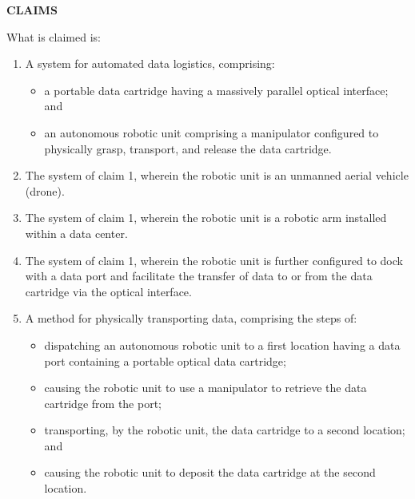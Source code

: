 \documentclass[11pt,letterpaper]{article}
\begin{document}
\thispagestyle{empty}

\begin{center}
    \textbf{\large CLAIMS}
\end{center}

\vspace{0.4cm}
\noindent What is claimed is:

\begin{enumerate}[label=\textbf{\arabic*.}, leftmargin=0.5in, itemsep=0.4cm]
    \item A system for automated data logistics, comprising:
    \begin{itemize}[leftmargin=0.3in, noitemsep]
        \item a portable data cartridge having a massively parallel optical interface; and
        \item an autonomous robotic unit comprising a manipulator configured to physically grasp, transport, and release the data cartridge.
    \end{itemize}

    \item The system of claim 1, wherein the robotic unit is an unmanned aerial vehicle (drone).

    \item The system of claim 1, wherein the robotic unit is a robotic arm installed within a data center.

    \item The system of claim 1, wherein the robotic unit is further configured to dock with a data port and facilitate the transfer of data to or from the data cartridge via the optical interface.

    \item A method for physically transporting data, comprising the steps of:
    \begin{itemize}[leftmargin=0.3in, noitemsep]
        \item dispatching an autonomous robotic unit to a first location having a data port containing a portable optical data cartridge;
        \item causing the robotic unit to use a manipulator to retrieve the data cartridge from the port;
        \item transporting, by the robotic unit, the data cartridge to a second location; and
        \item causing the robotic unit to deposit the data cartridge at the second location.
    \end{itemize}
\end{enumerate}
\end{document}
